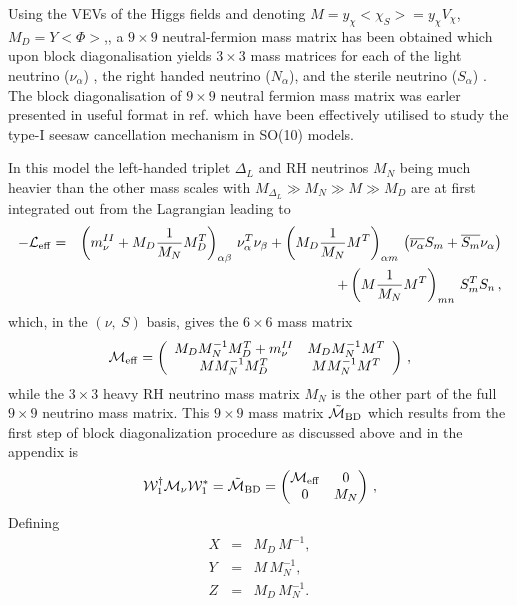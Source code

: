 \documentclass[a4paper,11pt]{article}
\newcommand{\bea}{\begin{eqnarray}}
\newcommand{\eea}{\end{eqnarray}}
\newcommand{\bmt}{\begin{pmatrix}}
\newcommand{\emt}{\end{pmatrix}}
\begin{document}
  
  Using the VEVs of the Higgs fields and denoting 
 $M=y_{\chi}<\chi_S> =y_{\chi}V_{\chi}$,   
$M_D = Y<{\Phi}> $,, 
a $9 \times 9$ neutral-fermion mass matrix has been obtained which upon
block diagonalisation yields  $3\times 3$ mass
matrices  for each of the light neutrino ($\nu_{\alpha}$) , the right handed
 neutrino ($N_{\alpha}$), and the sterile neutrino
 ($S_{\alpha}$) \cite{app:2013,pas:2014,bpn-mkp:2015}.
The block diagonalisation of $9\times 9$ neutral fermion mass matrix
was earler presented in  useful format in ref.\cite{LG:2000}
which have been effectively utilised to study the type-I seesaw
cancellation mechanism in SO(10) models.

In this model the left-handed triplet $\Delta_L$ and RH neutrinos
$M_N$ being much heavier than the other mass scales with 
$M_{\Delta_L}\gg M_N \gg M \gg M_D$ are at first integrated out from the Lagrangian leading to 
\begin{eqnarray}
- \mathcal{L}_{\rm eff} &=& \left(m_{\nu}^{II}+ M_D \frac{1}{M_N} M^T_D\right)_{\alpha \beta}\, \nu^T_\alpha \nu_\beta +
\left(M_D \frac{1}{M_N} M^T \right)_{\alpha m}\, \left(\overline{\nu_\alpha} S_m + \overline{S_m} \nu_\alpha \right)
\nonumber \\
&&\hspace*{4.0cm} +\left(M \frac{1}{M_N} M^T\right)_{m n}\, S^T_m S_n  \, ,
\end{eqnarray}
which, in the $\left(\nu,~ S\right)$ basis, gives the $6 \times 6$ mass matrix
\begin{eqnarray}
\mathcal{M}_{\rm eff} = \left( \begin{array}{cc}
    M_DM_N^{-1} M^T_D+m_{\nu}^{II}  &  M_D M_N^{-1} M^T    \\
    MM_N^{-1} M_D^T       & MM_N^{-1} M^T  
        \end{array} \right) \, ,
\label{eqn:eff_numatrix}       
\end{eqnarray}
while the $3\times 3$ heavy RH neutrino mass matrix $M_N$ is the other part of the full 
$9 \times 9$ neutrino mass matrix. This $9 \times 9$ mass matrix $\tilde{\mathcal{M}}_{\rm 
\tiny BD}$ which results from the first step of block diagonalization procedure as discussed 
above and in the appendix is
\begin{eqnarray}
\mathcal{W}^\dagger_1 \mathcal{M}_\nu \mathcal{W}^*_1 = 
\tilde{\mathcal{M}}_{\rm \tiny BD}
 = \bmt \mathcal{M}_{\rm eff} & 0\\
0& M_N
\emt \, ,
\end{eqnarray}
Defining
\bea
 X &=& M_D\,M^{-1},\nonumber\\
 Y&=&M\, M^{-1}_N,\nonumber\\
 Z&=&M_D\,M^{-1}_N.\label{eq:defXYZ}
\eea
\end{document}
